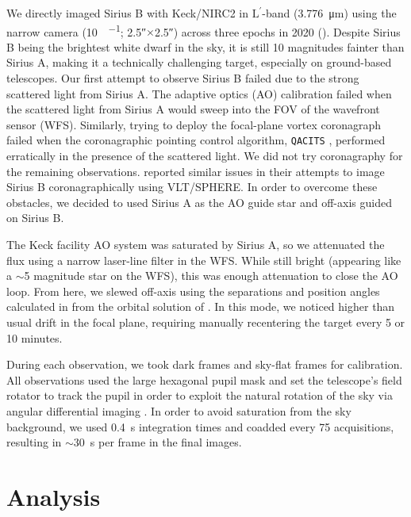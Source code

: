 \documentclass[twocolumn]{aastex631}
\newcommand\Lp{$\mathrm{L}^\prime$}
\begin{document}
We directly imaged Sirius B with Keck/NIRC2 in \Lp-band (\qty{3.776}{\micro\meter}) using the narrow camera (\qty{10}{\milliarcsecond\per\pixel}; \ang{;;2.5}$\times$\ang{;;2.5}) across three epochs in 2020 (). Despite Sirius B being the brightest white dwarf in the sky, it is still 10 magnitudes fainter than Sirius A, making it a technically challenging target, especially on ground-based telescopes. Our first attempt to observe Sirius B failed due to the strong scattered light from Sirius A. The adaptive optics (AO) calibration failed when the scattered light from Sirius A would sweep into the FOV of the wavefront sensor (WFS). Similarly, trying to deploy the focal-plane vortex coronagraph \citep{serabynKeckObservatoryInfrared2017} failed when the coronagraphic pointing control algorithm, \texttt{QACITS} \citep{hubyOnskyPerformanceQACITS2017a}, performed erratically in the presence of the scattered light. We did not try coronagraphy for the remaining observations. \citet[\S2]{viganHighcontrastImagingSirius2015} reported similar issues in their attempts to image Sirius B coronagraphically using VLT/SPHERE. In order to overcome these obstacles, we decided to used Sirius A as the AO guide star and off-axis guided on Sirius B.

The Keck facility AO system \citep{wizinowichPerformanceKeckObservatory2000} was saturated by Sirius A, so we attenuated the flux using a narrow laser-line filter in the WFS. While still bright (appearing like a $\sim$5 magnitude star on the WFS), this was enough attenuation to close the AO loop. From here, we slewed off-axis using the separations and position angles calculated in  from the orbital solution of \citet{bondSiriusSystemIts2017}. In this mode, we noticed higher than usual drift in the focal plane, requiring manually recentering the target every 5 or 10 minutes.

During each observation, we took dark frames and sky-flat frames for calibration. All observations used the large hexagonal pupil mask and set the telescope's field rotator to track the pupil in order to exploit the natural rotation of the sky via angular differential imaging \citep[ADI;][]{maroisAngularDifferentialImaging2006}. In order to avoid saturation from the sky background, we used \qty{0.4}{\second} integration times and coadded every \num{75} acquisitions, resulting in $\sim$\qty{30}{\second} per frame in the final images.

\section{Analysis}\label{sec:analysis}
\end{document}
